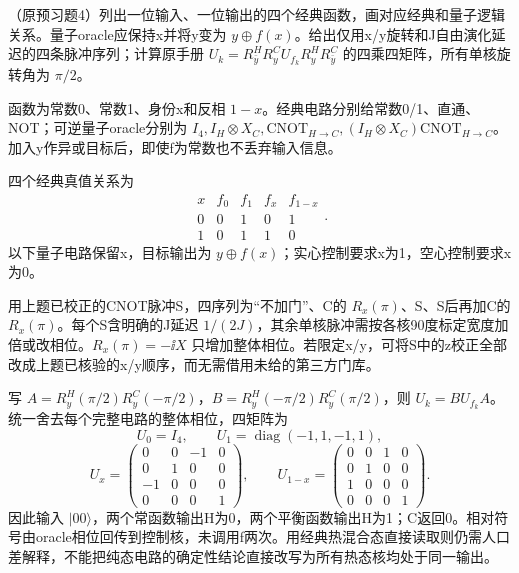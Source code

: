 \begin{exercise}
（原预习题4）列出一位输入、一位输出的四个经典函数，画对应经典和量子逻辑关系。量子oracle应保持x并将y变为 $y\oplus f(x)$。给出仅用x/y旋转和J自由演化延迟的四条脉冲序列；计算原手册 $U_k=R_{\bar y}^H R_y^C U_{f_k}R_y^H R_{\bar y}^C$ 的四乘四矩阵，所有单核旋转角为 $\pi/2$。
\end{exercise}
\begin{solution}
函数为常数0、常数1、身份x和反相 $1-x$。经典电路分别给常数0/1、直通、NOT；可逆量子oracle分别为 $I_4,I_H\otimes X_C,\mathrm{CNOT}_{H\to C},(I_H\otimes X_C)\mathrm{CNOT}_{H\to C}$。加入y作异或目标后，即使f为常数也不丢弃输入信息。

四个经典真值关系为
\[
\begin{array}{c|rrrr}x&f_0&f_1&f_x&f_{1-x}\\\hline
0&0&1&0&1\\1&0&1&1&0\end{array}.
\]
以下量子电路保留x，目标输出为 $y\oplus f(x)$；实心控制要求x为1，空心控制要求x为0。
\begin{center}\end{center}
用上题已校正的CNOT脉冲S，四序列为“不加门”、C的 $R_x(\pi)$、S、S后再加C的 $R_x(\pi)$。每个S含明确的J延迟 $1/(2J)$，其余单核脉冲需按各核90度标定宽度加倍或改相位。$R_x(\pi)=-\ii X$ 只增加整体相位。若限定x/y，可将S中的z校正全部改成上题已核验的x/y顺序，而无需借用未给的第三方门库。

写 $A=R_y^H(\pi/2)R_y^C(-\pi/2)$，$B=R_y^H(-\pi/2)R_y^C(\pi/2)$，则 $U_k=BU_{f_k}A$。统一舍去每个完整电路的整体相位，四矩阵为
\[
 U_0=I_4,\qquad U_1=\operatorname{diag}(-1,1,-1,1),
\]
\[
 U_x=\begin{pmatrix}0&0&-1&0\\0&1&0&0\\-1&0&0&0\\0&0&0&1\end{pmatrix},\qquad
 U_{1-x}=\begin{pmatrix}0&0&1&0\\0&1&0&0\\1&0&0&0\\0&0&0&1\end{pmatrix}.
\]
因此输入 $|00\rangle$，两个常函数输出H为0，两个平衡函数输出H为1；C返回0。相对符号由oracle相位回传到控制核，未调用f两次。用经典热混合态直接读取则仍需人口差解释，不能把纯态电路的确定性结论直接改写为所有热态核均处于同一输出。


\end{solution}
